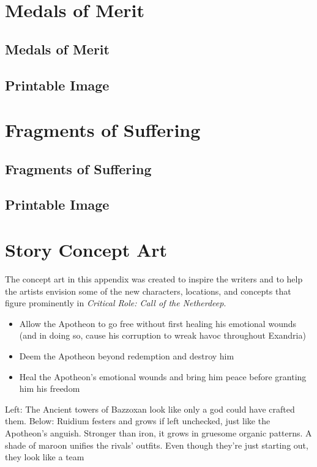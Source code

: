 \documentclass[letterpaper, 11pt, bg=full, twocolumn]{dndbook}
\begin{document}
\chapter{Medals of Merit}\label{ch:medals-of-merit-11-11}

\section{Medals of Merit}
\section{Printable Image}


\chapter{Fragments of Suffering}\label{ch:fragments-of-suffering-12-12}

\section{Fragments of Suffering}
\section{Printable Image}


\chapter{Story Concept Art}\label{ch:story-concept-art-13-13}

The concept art in this appendix was created to inspire the writers and to help the artists envision some of the new characters, locations, and concepts that figure prominently in \textit{Critical Role: Call of the Netherdeep}.
\begin{itemize}
\item Allow the Apotheon to go free without first healing his emotional wounds (and in doing so, cause his corruption to wreak havoc throughout Exandria)
\item Deem the Apotheon beyond redemption and destroy him
\item Heal the Apotheon's emotional wounds and bring him peace before granting him his freedom
\end{itemize}
Left: The Ancient towers of Bazzoxan look like only a god could have crafted them.
Below: Ruidium festers and grows if left unchecked, just like the Apotheon's anguish. Stronger than iron, it grows in gruesome organic patterns.
A shade of maroon unifies the rivals' outfits. Even though they're just starting out, they look like a team
\end{document}
